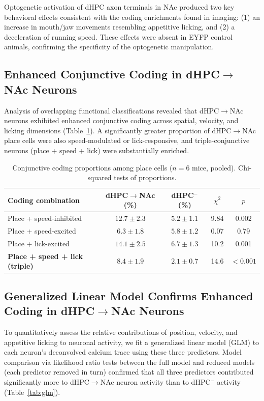 \documentclass[11pt]{article}
\begin{document}
Optogenetic activation of dHPC axon terminals in NAc produced two key behavioral effects consistent with the coding enrichments found in imaging: (1) an increase in mouth/jaw movements resembling appetitive licking, and (2) a deceleration of running speed. These effects were absent in EYFP control animals, confirming the specificity of the optogenetic manipulation.

\subsection{Enhanced Conjunctive Coding in dHPC$\to$NAc Neurons}

Analysis of overlapping functional classifications revealed that dHPC$\to$NAc neurons exhibited enhanced conjunctive coding across spatial, velocity, and licking dimensions (Table~\ref{tab:conjunctive}). A significantly greater proportion of dHPC$\to$NAc place cells were also speed-modulated or lick-responsive, and triple-conjunctive neurons (place + speed + lick) were substantially enriched.

\begin{table}[htbp]
\centering
\caption{Conjunctive coding proportions among place cells ($n = 6$ mice, pooled). Chi-squared tests of proportions.}
\label{tab:conjunctive}
\begin{tabular}{lcccc}
\toprule
\textbf{Coding combination} & \textbf{dHPC$\to$NAc (\%)} & \textbf{dHPC$^{-}$ (\%)} & \textbf{$\chi^2$} & \textbf{$p$} \\
\midrule
Place + speed-inhibited & $12.7 \pm 2.3$ & $5.2 \pm 1.1$ & 9.84 & 0.002 \\
Place + speed-excited & $6.3 \pm 1.8$ & $5.8 \pm 1.2$ & 0.07 & 0.79 \\
Place + lick-excited & $14.1 \pm 2.5$ & $6.7 \pm 1.3$ & 10.2 & 0.001 \\
\textbf{Place + speed + lick (triple)} & $\mathbf{8.4 \pm 1.9}$ & $2.1 \pm 0.7$ & 14.6 & $<0.001$ \\
\bottomrule
\end{tabular}
\end{table}

\subsection{Generalized Linear Model Confirms Enhanced Coding in dHPC$\to$NAc Neurons}

To quantitatively assess the relative contributions of position, velocity, and appetitive licking to neuronal activity, we fit a generalized linear model (GLM) to each neuron's deconvolved calcium trace using these three predictors. Model comparison via likelihood ratio tests between the full model and reduced models (each predictor removed in turn) confirmed that all three predictors contributed significantly more to dHPC$\to$NAc neuron activity than to dHPC$^{-}$ activity (Table~\ref{tab:glm}).
\end{document}
